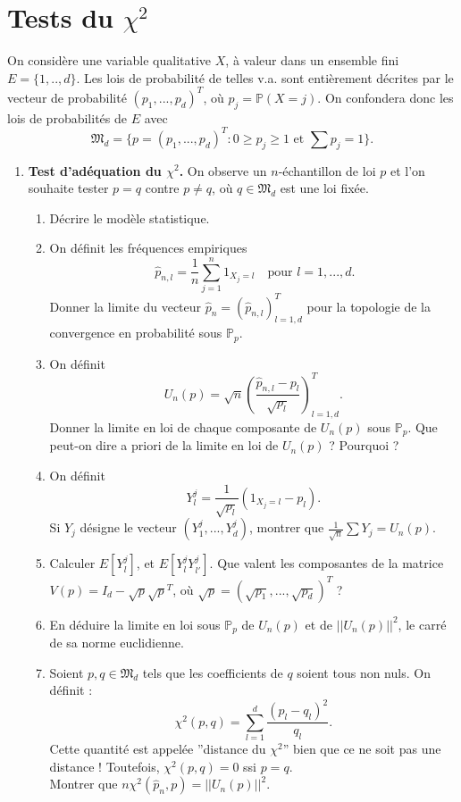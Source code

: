 \section{ Tests du $\chi^2$}

On considère une variable qualitative $X$, à valeur dans un ensemble fini $E=\{1,..,d\}$. Les lois de probabilité de telles v.a. sont entièrement décrites par le vecteur de probabilité $(p_1,...,p_d)^T$, où $p_j=\mathbb P(X=j)$. On confondera donc les lois de probabilités de $E$ avec 
\[\mathfrak M_d=\{p=(p_1,...,p_d)^T : 0\geq p_j\geq 1 \text{ et } \sum p_j = 1\}.\]

\begin{enumerate}
\item \textbf{Test d'adéquation du $\chi^2$.} On observe un $n$-échantillon de loi $p$ et l'on souhaite tester $p=q$ contre $p\neq q$, où $q\in \mathfrak M_d$ est une loi fixée.
\begin{enumerate}
\item Décrire le modèle statistique.
\item On définit les fréquences empiriques
\[\ \hat p_{n,l} = \frac{1}{n}\sum_{j=1}^n 1_{X_j=l}\quad\text{pour }l=1,...,d.\]
Donner la limite du vecteur $\hat p_n=(\hat p_{n,l} )_{l=1,d}^T$ pour la topologie de la convergence en probabilité sous $\mathbb P_p$.
\item On définit
\[U_n(p)=\sqrt{n}(\frac{\hat p_{n,l}-p_l}{\sqrt{p_l}})_{l=1,d}^T.\]
Donner la limite en loi de chaque composante de $U_n(p)$ sous $\mathbb P_p$. Que peut-on dire a priori de la limite en loi de $U_n(p)$ ? Pourquoi ?
\item On définit
\[Y_l^j = \frac{1}{\sqrt{p_l}}(1_{X_j=l}-p_l).\]
Si $Y_j$ désigne le vecteur $(Y_1^j, ... ,Y_d^j) $, montrer que $\frac{1}{\sqrt{n}}\sum Y_j = U_n(p)$.
\item Calculer $E[Y^j _l ]$, et $E[Y^j _l Y_{l'}^j]$. Que valent les composantes de la matrice $V(p)= I_d- \sqrt{p}\sqrt{p}^T$, où $\sqrt{p}=(\sqrt{p_1}, ... , \sqrt{p_d})^T$ ?
\item En déduire la limite en loi sous $\mathbb P_p$ de $U_n(p)$ et de $||U_n(p)||^2$, le carré de sa norme euclidienne.
\item Soient $p,q\in \mathfrak M_d$ tels que les coefficients de $q$ soient tous non nuls. On définit :
\[\chi^2 (p,q) = \sum_{l=1}^d\frac{(p_l-q_l)^2}{q_l}.\]
Cette quantité est appelée ''distance du $\chi^2$'' bien que ce ne soit pas une distance ! Toutefois, $\chi^2(p,q)=0$ ssi $p=q$.\\
Montrer que $n\chi^2(\hat p_n,p)= ||U_n(p)||^2$.

\end{enumerate}
\end{enumerate}
